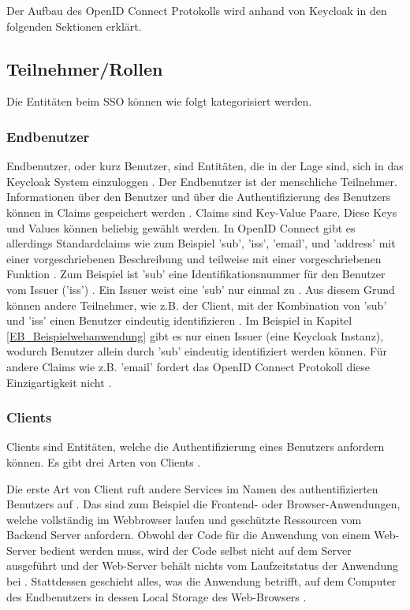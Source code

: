 Der Aufbau des OpenID Connect Protokolls wird anhand von Keycloak in den folgenden Sektionen erklärt.

\subsection{Teilnehmer/Rollen}

Die Entitäten beim SSO können wie folgt kategorisiert werden.

\subsubsection{Endbenutzer} \label{EB_End-Benutzer}

Endbenutzer, oder kurz Benutzer, sind Entitäten, die in der Lage sind, sich in das Keycloak System einzuloggen \cite{EB46}. Der Endbenutzer ist der menschliche Teilnehmer. Informationen über den Benutzer und über die Authentifizierung des Benutzers können in Claims gespeichert werden \cite{EB53}. Claims sind Key-Value Paare. Diese Keys und Values können beliebig gewählt werden. In OpenID Connect gibt es allerdings Standardclaims wie zum Beispiel 'sub', 'iss', 'email', und 'address' mit einer vorgeschriebenen Beschreibung und teilweise mit einer vorgeschriebenen Funktion \cite{EB54}. Zum Beispiel ist 'sub' eine Identifikationsnummer für den Benutzer vom Issuer ('iss') \cite{EB54}. Ein Issuer weist eine 'sub' nur einmal zu \cite{EB55}. Aus diesem Grund können andere Teilnehmer, wie z.B. der Client, mit der Kombination von 'sub' und 'iss' einen Benutzer eindeutig identifizieren \cite{EB55}. Im Beispiel in Kapitel \ref{EB_Beispielwebanwendung} gibt es nur einen Issuer (eine Keycloak Instanz), wodurch Benutzer allein durch 'sub' eindeutig identifiziert werden können. Für andere Claims wie z.B. 'email' fordert das OpenID Connect Protokoll diese Einzigartigkeit nicht \cite{EB55}.

\subsubsection{Clients} \label{EB_Client}

Clients sind Entitäten, welche die Authentifizierung eines Benutzers anfordern können. Es gibt drei Arten von Clients \cite{OAuth2inAction}.

Die erste Art von Client ruft andere Services im Namen des authentifizierten Benutzers auf \cite{EB2} \cite{EB3}. Das sind zum Beispiel die Frontend- oder Browser-Anwendungen, welche vollständig im Webbrowser laufen und geschützte Ressourcen vom Backend Server anfordern. Obwohl der Code für die Anwendung von einem Web-Server bedient werden muss, wird der Code selbst nicht auf dem Server ausgeführt und der Web-Server behält nichts vom Laufzeitstatus der Anwendung bei \cite{OAuth2inAction}. Stattdessen geschieht alles, was die Anwendung betrifft, auf dem Computer des Endbenutzers in dessen Local Storage des Web-Browsers \cite{OAuth2inAction}.

